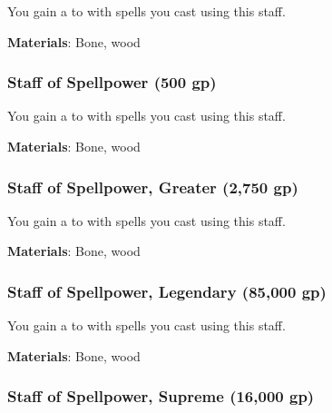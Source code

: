 You gain a   to  with spells you cast using this staff.



\textbf{Materials}: Bone, wood


\lowercase{\hypertarget{item:Staff of Spellpower}{}}\label{item:Staff of Spellpower}
\hypertarget{item:Staff of Spellpower}{\subsubsection{Staff of Spellpower\hfill{} (500 gp)}}

You gain a   to  with spells you cast using this staff.



\textbf{Materials}: Bone, wood


\lowercase{\hypertarget{item:Staff of Spellpower, Greater}{}}\label{item:Staff of Spellpower, Greater}
\hypertarget{item:Staff of Spellpower, Greater}{\subsubsection{Staff of Spellpower, Greater\hfill{} (2,750 gp)}}

You gain a   to  with spells you cast using this staff.



\textbf{Materials}: Bone, wood


\lowercase{\hypertarget{item:Staff of Spellpower, Legendary}{}}\label{item:Staff of Spellpower, Legendary}
\hypertarget{item:Staff of Spellpower, Legendary}{\subsubsection{Staff of Spellpower, Legendary\hfill{} (85,000 gp)}}

You gain a   to  with spells you cast using this staff.



\textbf{Materials}: Bone, wood


\lowercase{\hypertarget{item:Staff of Spellpower, Supreme}{}}\label{item:Staff of Spellpower, Supreme}
\hypertarget{item:Staff of Spellpower, Supreme}{\subsubsection{Staff of Spellpower, Supreme\hfill{} (16,000 gp)}}

